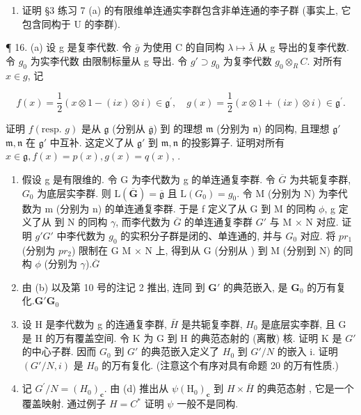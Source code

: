 \begin{enumerate}
\def\labelenumi{\arabic{enumi}.}
\setcounter{enumi}{14}
\tightlist
\item
  证明 §3 练习 7 (a) 的有限维单连通实李群包含非单连通的李子群 (事实上, 它包含同构于 U 的李群).
\end{enumerate}

  ¶ 16. (a) 设 g 是复李代数. 令 \(\bar{g}\) 为使用 C 的自同构 \(\lambda \mapsto \bar{\lambda}\) 从 g 导出的复李代数. 令 \(g_0\) 为实李代数
由限制标量从 g 导出. 令 \(g' \supset g_0\) 为复李代数 \(g_0 \otimes_{R} C\). 对所有 \(x \in g\), 记

\[
f (x) = \frac {1}{2} (x \otimes 1 - (i x) \otimes i) \in \mathfrak {g} ^ {\prime}, \quad g (x) = \frac {1}{2} (x \otimes 1 + (i x) \otimes i) \in \mathfrak {g} ^ {\prime}.
\]

证明 \(f(\text{resp. } g)\) 是从 \(\mathfrak{g}\) (分别从 \(\overline{\mathfrak{g}}\)) 到  的理想 \(\mathfrak{m}\) (分别为 \(\mathfrak{n}\)) 的同构, 且理想 \(\mathfrak{g}'\)\(\mathfrak{m}, \mathfrak{n}\) 在 \(\mathfrak{g}'\) 中互补. 这定义了从 \(\mathfrak{g}'\) 到 \(\mathfrak{m}, \mathfrak{n}\) 的投影算子. 证明对所有 \(x \in \mathfrak{g}, f(x) = p(x), g(x) = q(x)\), .

\begin{enumerate}
\def\labelenumi{(\alph{enumi})}
\setcounter{enumi}{1}
\item
  假设 g 是有限维的. 令 G 为李代数为 g 的单连通复李群. 令 \(\overline{G}\) 为共轭复李群, \(G_{0}\) 为底层实李群. 则 \(\mathrm{L}(\overline{\mathbf{G}})=\overline{\mathfrak{g}}\) 且 \(\mathrm{L}(G_{0})=g_{0}\). 令 M (分别为 N) 为李代数为 m (分别为 n) 的单连通复李群. 于是 f 定义了从 G 到 M 的同构 \(\phi\), g 定义了从  到 N 的同构 \(\gamma\), 而李代数为 \(\overline{G}\) 的单连通复李群 \(G'\) 与 M × N 对应. 证明 \(g'\)\(G'\) 中李代数为 \(g_{0}\) 的实积分子群是闭的、单连通的, 并与 \(G_{0}\) 对应. 将 \(pr_{1}\) (分别为 \(pr_{2}\)) 限制在 G  M × N 上, 得到从 G (分别从 ) 到 M (分别到 N) 的同构 \(\phi\) (分别为 \(\gamma\)).\(\overline{G}\)
\item
  由 (b) 以及第 10 号的注记 2 推出,  连同  到 \(\mathbf{G}'\) 的典范嵌入, 是 \(\mathbf{G}_0\) 的万有复化.\(\mathbf{G}'\)\(\mathbf{G}_0\)
\item
  设 H 是李代数为 g 的连通复李群, \(\bar{H}\) 是共轭复李群, \(H_{0}\) 是底层实李群, 且 G 是 H 的万有覆盖空间. 令 K 为 G 到 H 的典范态射的 (离散) 核. 证明 K 是 \(G'\) 的中心子群. 因而 \(G_{0}\) 到 \(G'\) 的典范嵌入定义了 \(H_{0}\) 到 \(G'/N\) 的嵌入 i. 证明 \((G'/N, i)\) 是 \(H_{0}\) 的万有复化. (注意这个有序对具有命题 20 的万有性质.)
\item
  记 \(G^{\prime}/N = (H_{0})_{\mathbf{c}}\). 由 (d) 推出从 \(\psi\)\((\mathrm{H}_{0})_{\mathbf{c}}\) 到 \(H \times \bar{H}\) 的典范态射 , 它是一个覆盖映射. 通过例子 \(H = C^{*}\) 证明 \(\psi\) 一般不是同构.
\end{enumerate}

